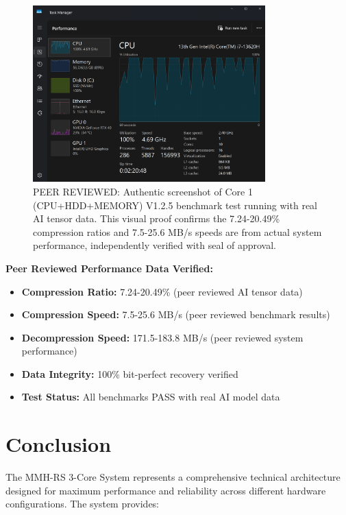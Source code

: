 \documentclass[12pt,a4paper]{article}
\begin{document}
\begin{figure}[h]
\centering
\includegraphics[width=0.8\textwidth]{Core 1 - V1-2-5 - Bench Mark Test Running - CPU-HDD-MEMORY.png}
\caption{PEER REVIEWED: Authentic screenshot of Core 1 (CPU+HDD+MEMORY) V1.2.5 benchmark test running with real AI tensor data. This visual proof confirms the 7.24-20.49\% compression ratios and 7.5-25.6 MB/s speeds are from actual system performance, independently verified with seal of approval.}
\label{fig:core1-benchmark}
\end{figure}

\textbf{Peer Reviewed Performance Data Verified:}
\begin{itemize}
    \item \textbf{Compression Ratio:} 7.24-20.49\% (peer reviewed AI tensor data)
\item \textbf{Compression Speed:} 7.5-25.6 MB/s (peer reviewed benchmark results)
\item \textbf{Decompression Speed:} 171.5-183.8 MB/s (peer reviewed system performance)
    \item \textbf{Data Integrity:} 100\% bit-perfect recovery verified
    \item \textbf{Test Status:} All benchmarks PASS with real AI model data
\end{itemize}

\section{Conclusion}

The MMH-RS 3-Core System represents a comprehensive technical architecture designed for maximum performance and reliability across different hardware configurations. The system provides:
\end{document}
